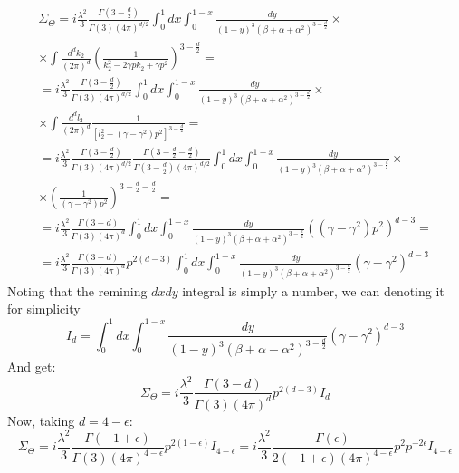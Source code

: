 \documentclass{article}
\begin{document}
\begin{equation}
\begin{gathered}
    \Sigma_\Theta = i\frac{\lambda^2}{3} \frac{\Gamma\left(3 - \frac{d}{2}\right)}{\Gamma(3)(4\pi)^{d/2}} \int_0^1 dx \int_0^{1-x} \frac{dy}{(1 - y)^3(\beta + \alpha + \alpha^2)^{3 - \frac{d}{2}}} \times \\ \times \int \frac{d^dk_2}{(2\pi)^d} \left(
        \frac{1}{k_2^2 - 2\gamma pk_2 + \gamma p^2}
    \right)^{3 - \frac{d}{2}} = \\ =
    i\frac{\lambda^2}{3} \frac{\Gamma\left(3 - \frac{d}{2}\right)}{\Gamma(3)(4\pi)^{d/2}} \int_0^1 dx \int_0^{1-x} \frac{dy}{(1 - y)^3(\beta + \alpha + \alpha^2)^{3 - \frac{d}{2}}} \times \\ \times \int \frac{d^dl_2}{(2\pi)^d} \frac{1}{\left[l_2^2 + (\gamma - \gamma^2) p^2\right]^{3 - \frac{d}{2}}} = \\ =
    i\frac{\lambda^2}{3} \frac{\Gamma\left(3 - \frac{d}{2}\right)}{\Gamma(3)(4\pi)^{d/2}}  \frac{\Gamma\left(3 - \frac{d}{2} - \frac{d}{2}\right)}{\Gamma\left(3 - \frac{d}{2}\right)(4\pi)^{d/2}} \int_0^1 dx \int_0^{1-x} \frac{dy}{(1 - y)^3(\beta + \alpha + \alpha^2)^{3 - \frac{d}{2}}} \times \\ \times \left(\frac{1}{(\gamma - \gamma^2) p^2}\right)^{3 - \frac{d}{2} - \frac{d}{2}} = \\ =
    i\frac{\lambda^2}{3} \frac{\Gamma\left(3 - d\right)}{\Gamma(3)(4\pi)^{d}} \int_0^1 dx \int_0^{1-x} \frac{dy}{(1 - y)^3(\beta + \alpha + \alpha^2)^{3 - \frac{d}{2}}} \left((\gamma - \gamma^2) p^2\right)^{d - 3} = \\ =
    i\frac{\lambda^2}{3} \frac{\Gamma\left(3 - d\right)}{\Gamma(3)(4\pi)^{d}} p^{2(d - 3)} \int_0^1 dx \int_0^{1-x} \frac{dy}{(1 - y)^3(\beta + \alpha + \alpha^2)^{3 - \frac{d}{2}}} \left(\gamma - \gamma^2\right)^{d - 3}
\end{gathered}
\end{equation}
Noting that the remining $dx dy$ integral is simply a number, we can denoting it for simplicity
\begin{equation}
    I_d = \int_0^1 dx \int_0^{1-x} \frac{dy}{(1 - y)^3(\beta + \alpha - \alpha^2)^{3 - \frac{d}{2}}} \left(\gamma - \gamma^2\right)^{d - 3}
\end{equation}
And get:
\begin{equation}
    \Sigma_\Theta = i\frac{\lambda^2}{3} \frac{\Gamma\left(3 - d\right)}{\Gamma(3)(4\pi)^{d}} p^{2(d - 3)} I_d
\end{equation}
Now, taking $d = 4 - \epsilon$:
\begin{equation}
    \Sigma_\Theta = i\frac{\lambda^2}{3} \frac{\Gamma\left(-1 + \epsilon\right)}{\Gamma(3)(4\pi)^{4 - \epsilon}} p^{2(1 - \epsilon)} I_{4 - \epsilon} = 
    i\frac{\lambda^2}{3} \frac{\Gamma(\epsilon)}{2(-1 + \epsilon)(4\pi)^{4 - \epsilon}} p^2 p^{-2\epsilon} I_{4 - \epsilon}
\end{equation}
\end{document}

